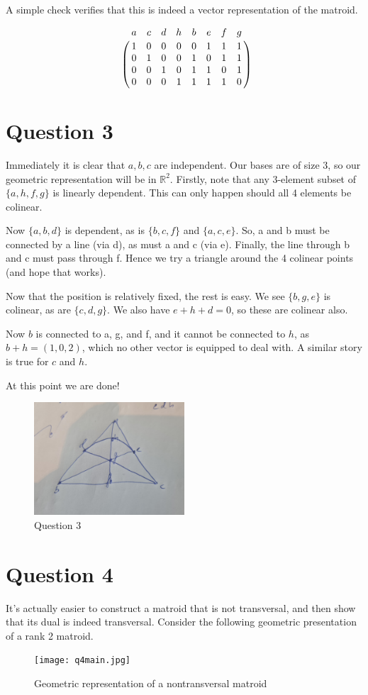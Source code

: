 \documentclass{article}
\begin{document}
A simple check verifies that this is indeed a vector representation of the matroid.

\[
    \bordermatrix{
        & a & c & d & h & b & e & f & g \cr
        & 1 & 0 & 0 & 0 & 0 & 1 & 1 & 1 \cr
        & 0 & 1 & 0 & 0 & 1 & 0 & 1 & 1 \cr
        & 0 & 0 & 1 & 0 & 1 & 1 & 0 & 1 \cr
        & 0 & 0 & 0 & 1 & 1 & 1 & 1 & 0
            }
\]
\section*{Question 3}
Immediately it is clear that $a, b, c$ are independent. Our bases are of size 3, so our geometric representation will be in $\mathbb{R}^2$.
Firstly, note that any 3-element subset of $\{a, h, f, g\}$
is linearly dependent. This can only happen should all 4
elements be colinear.

Now $\{a, b, d\}$ is dependent, as is $\{b, c, f\}$ and $\{a, c, e\}$.
So, a and b must be connected by a line (via d), as must a and c (via e). Finally, the line through b and c
must pass through f. Hence we try a triangle around the 4 colinear points (and hope that works).

Now that the position is relatively fixed, the rest is easy. 
We see $\{b, g, e\}$ is colinear, as are $\{c, d, g\}$.
We also have $e+h+d=0$, so these are colinear also.

Now $b$ is connected to a, g, and f, and it cannot be connected to $h$,
as $b+h=(1, 0, 2)$, which no other vector is equipped to deal with.
A similar story is true for $c$ and $h$.

At this point we are done!



\begin{figure}[!htb]
    \centering
    \includegraphics[width=0.5\textwidth]{q3.jpg}
    \caption{Question 3}
\end{figure}

\section*{Question 4}
It's actually easier to construct a matroid that is not transversal, and then show that its dual is indeed transversal.
Consider the following geometric presentation of a rank 2 matroid.
\begin{figure}[!htb]
    \centering
    \texttt{[image: q4main.jpg]}
    \caption{Geometric representation of a nontransversal matroid}
\end{figure}
\end{document}
